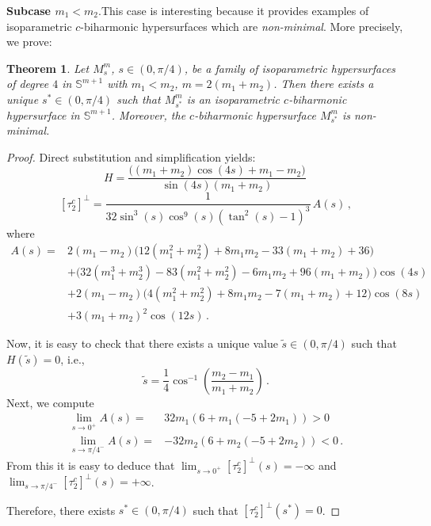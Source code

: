 \documentclass[11pt,leqno]{amsart}
\theoremstyle{plain}
\newtheorem{theorem}                {Theorem}      [section]
\theoremstyle{definition}
\numberwithin{equation}{section}
\def \s{{\mathbb S}}
\numberwithin{equation}{section}
\begin{document}
{\textbf{Subcase $m_1 < m_2$}.\quad This case is interesting because it provides examples of isoparametric $c$-biharmonic hypersurfaces which are \textit{non-minimal}. More precisely, we prove:
\begin{theorem}\label{Th-c-biharm-not-minimal-l=4}
Let $M_s^m$, $s\in(0,\pi/4)$, be a family of isoparametric hypersurfaces of degree $4$ in $\s^{m+1}$ with $m_1<m_2$, $m=2(m_1+m_2)$. Then there exists a unique $s^*\in(0,\pi/4)$ such that $M_{s^*}^m$ is an isoparametric $c$-biharmonic hypersurface in $\s^{m+1}$. Moreover, the $c$-biharmonic hypersurface $M_{s^*}^m$ is non-minimal.
\end{theorem}
\begin{proof}
Direct substitution and simplification yields:
\[
H=\frac{ \Big((m_1+m_2) \cos (4s)+m_1-m_2 \Big)}{\sin(4s) (m_1+m_2)}\,
\]
\[
[\tau_2^c]^\perp=\frac{1}{32 \sin^3(s) \cos^9(s)\left(\tan ^2(s)-1\right)^3} \,A(s)\,,
\]
where
\begin{equation}\label{eq:polyAs}
\begin{aligned}
A(s)=&2 (m_1 - m_2) \big(12 (m_1^2 + m_2^2) + 8 m_1 m_2 - 33 ( m_1 + m_2) + 36\big)\\
   &+ \big(32 (m_1^3 + m_2^3) - 83 (m_1^2 + m_2^2) - 6 m_1 m_2 + 96 (m_1 + m_2)\big)\cos (4 s)\\
   &+2 (m_1 - m_2) \big(4 (m_1^2 + m_2^2) + 8 m_1 m_2 - 7 (m_1 + m_2) + 12\big) \cos (8 s)\\
   &+3 (m_1 + m_2)^2 \cos (12 s)\,.
\end{aligned}
\end{equation}

Now, it is easy to check that there exists a unique value $\tilde{s}\in (0,\pi/4)$ such that $H(\tilde{s})=0$, i.e.,
\[
\tilde{s}= \frac{1}{4} \cos
   ^{-1}\left(\frac{m_2-m_1}{m_1+m_2}\right)\,.
\]
Next, we compute
\begin{equation}\label{eq:limiti}
\begin{aligned}
\lim_{s\to 0^+} A(s) =& 32 m_1 (6 + m_1 (-5 + 2 m_1))>0\\
\lim_{s\to \pi/4^-} A (s)  =&-32 m_2 (6 + m_2 (-5 + 2 m_2))<0\,.
\end{aligned}
\end{equation}
From this it is easy to deduce that $\lim_{s \to 0^+}[\tau_2^c]^\perp(s)=-\infty$ and $\lim_{s \to \pi/4 ^-}[\tau_2^c]^\perp(s)=+\infty$. 

Therefore, there exists $s^*\in (0,\pi/4)$ such that $[\tau_2^c]^\perp(s^*)=0$. 


\end{proof}}
\end{document}

